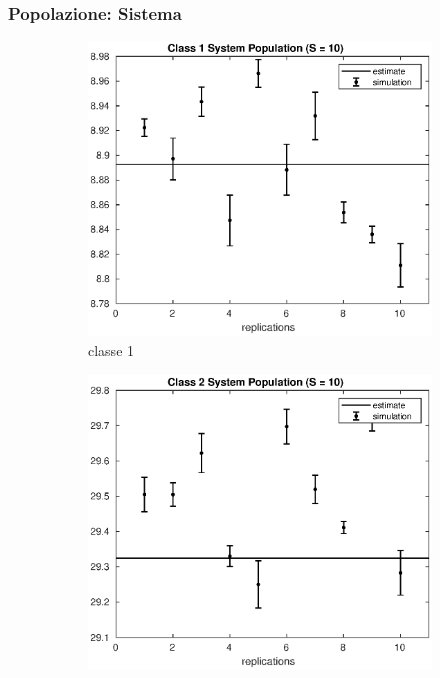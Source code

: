 \subsubsection{Popolazione: Sistema}
%
\begin{figure}[!h]
\centering
%
\begin{subfigure}[t]{0.49\textwidth}
\includegraphics[width=\textwidth]{figures/simul/10_500K_n1}
\caption{classe 1}
\label{10_n1}
\end{subfigure}
%
\begin{subfigure}[t]{0.49\textwidth}
\includegraphics[width=\textwidth]{figures/simul/10_500K_n2}

\end{subfigure}
\end{figure}
